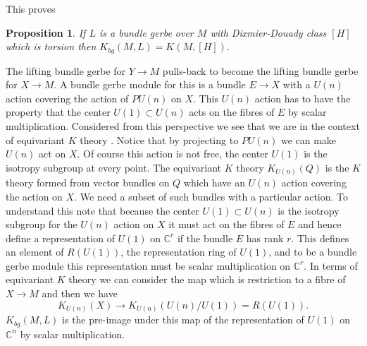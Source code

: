 \documentclass[a4paper,reqno]{amsart}
\theoremstyle{plain}
\newtheorem{proposition}[theorem]{Proposition}
\theoremstyle{definition}
\theoremstyle{remark}
\numberwithin{equation}{section}
\numberwithin{figure}{section}
\newcommand{\CC}{{\mathbb C}}
\newcommand{\<}{\langle}
\renewcommand{\>}{\rangle}
\begin{document}
This proves
\begin{proposition} If $L$ is a bundle gerbe over $M$ with
Dixmier-Douady class $[H]$
which is torsion then
$K_{bg}(M, L) = K(M, [H])$.
\end{proposition}


The lifting bundle gerbe for $Y \to M$ pulls-back to become the lifting
bundle gerbe for $X \to M$.  A bundle gerbe module for
this is a bundle $E \to X$ with a $U(n)$ action covering the
action of $PU(n)$ on $X$.  This $U(n)$ action has to have the
property that the center $U(1) \subset U(n)$ acts on the fibres of
$E$ by scalar multiplication.  Considered from this perspective we see that
we are in  the context
of equivariant $K$ theory \cite{Seg1}. Notice that by projecting to
$PU(n)$ we can make
$U(n)$ act on
$X$. Of course this action is
not   free, the center $U(1)$ is the isotropy subgroup
at every point.   The equivariant $K$ theory
$K_{U(n)}(Q)$ is the $K$ theory formed from vector bundles
on $Q$ which have an $U(n)$ action covering the action on $X$.  We
need a subset
of such bundles with a particular action.  To understand this note that
because the center $U(1) \subset U(n)$ is the isotropy subgroup for the $U(n)$
action on $X$ it must act on the fibres of $E$ and hence define a
representation
of $U(1)$ on $\CC^r$ if the bundle $E$ has rank $r$.  This defines an
element of
$R(U(1))$, the representation ring  of $U(1)$, and to be a bundle gerbe module
this representation must be scalar multiplication on $\CC^r$.  In terms
of equivariant $K$ theory we can consider the map which is
restriction to a fibre of $X \to M$ and then we have
$$
K_{U(n)}(X) \to K_{U(n)}(U(n)/U(1)) = R(U(1)).
$$
$K_{bg}(M, L)$ is the pre-image under this map of the representation
of $U(1)$ on $\CC^n$ by scalar multiplication.

\end{document}
